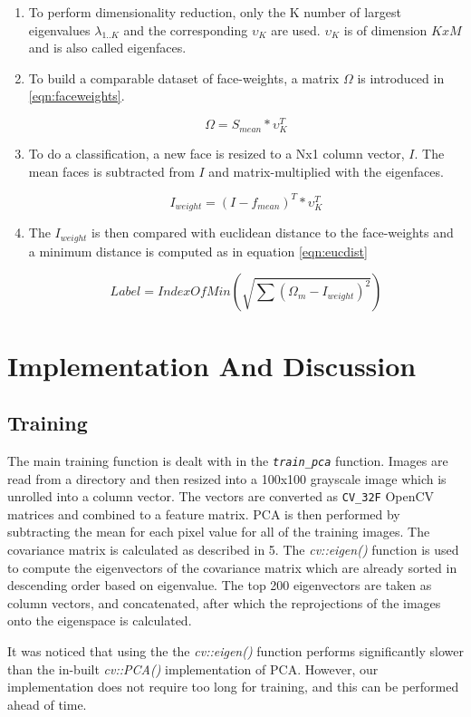 \documentclass[a4paper]{article}
\begin{document}
\begin{enumerate}
\item To perform dimensionality reduction, only the K number of largest eigenvalues $\lambda_{1..K}$ and the corresponding $\upsilon_{K}$ are used. $\upsilon_{K}$ is of dimension $K x M$ and is also called eigenfaces. 

\item To build a comparable dataset of face-weights, a matrix $\Omega$ is introduced in \ref{eqn:faceweights}.

\begin{equation}
\Omega = S_{mean}*\upsilon_{K}^T
\label{eqn:faceweights}
\end{equation}

\item To do a classification, a new face is resized to a Nx1 column vector, $I$. The mean faces is subtracted from $I$ and matrix-multiplied with the eigenfaces. 

\begin{equation}
I_{weight} = (I-f_{mean})^T*\upsilon_{K}^T
\label{eqn:faceweights}
\end{equation}

\item The $I_{weight}$ is then compared with euclidean distance to the face-weights and a minimum distance is computed as in equation \ref{eqn:eucdist}

\begin{equation}
Label = IndexOfMin(\sqrt{\sum (\Omega_{m}-I_{weight})^2})
\label{eqn:eucdist}
\end{equation}

\end{enumerate}	

\section{Implementation And Discussion}
\subsection{Training}

The main training function is dealt with in the \textit{\texttt{train\_pca}} function. Images are read from a directory and then resized into a 100x100 grayscale image which is unrolled into a column vector. The vectors are converted as \texttt{CV\_32F} OpenCV matrices and combined to a feature matrix. PCA is then performed by subtracting the mean for each pixel value for all of the training images. The covariance matrix is calculated as described in 5. The \textit{cv::eigen()} function is used to compute the eigenvectors of the covariance matrix which are already sorted in descending order based on eigenvalue. The top 200 eigenvectors are taken as column vectors, and concatenated, after which the reprojections of the images onto the eigenspace is calculated.
\par
It was noticed that using the the \textit{cv::eigen()} function performs significantly slower than the in-built \textit{cv::PCA()} implementation of PCA. However, our implementation does not require too long for training, and this can be performed ahead of time.
\end{document}
